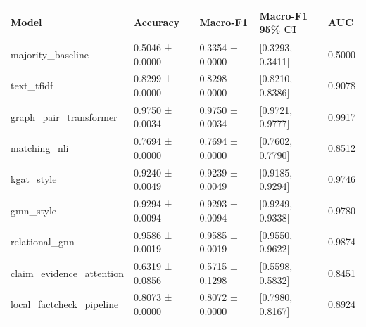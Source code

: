 \begin{tabular}{lllll}
\toprule
Model & Accuracy & Macro-F1 & Macro-F1 95\% CI & AUC \\
\midrule
majority\_baseline & 0.5046 ± 0.0000 & 0.3354 ± 0.0000 & [0.3293, 0.3411] & 0.5000 \\
text\_tfidf & 0.8299 ± 0.0000 & 0.8298 ± 0.0000 & [0.8210, 0.8386] & 0.9078 \\
graph\_pair\_transformer & 0.9750 ± 0.0034 & 0.9750 ± 0.0034 & [0.9721, 0.9777] & 0.9917 \\
matching\_nli & 0.7694 ± 0.0000 & 0.7694 ± 0.0000 & [0.7602, 0.7790] & 0.8512 \\
kgat\_style & 0.9240 ± 0.0049 & 0.9239 ± 0.0049 & [0.9185, 0.9294] & 0.9746 \\
gmn\_style & 0.9294 ± 0.0094 & 0.9293 ± 0.0094 & [0.9249, 0.9338] & 0.9780 \\
relational\_gnn & 0.9586 ± 0.0019 & 0.9585 ± 0.0019 & [0.9550, 0.9622] & 0.9874 \\
claim\_evidence\_attention & 0.6319 ± 0.0856 & 0.5715 ± 0.1298 & [0.5598, 0.5832] & 0.8451 \\
local\_factcheck\_pipeline & 0.8073 ± 0.0000 & 0.8072 ± 0.0000 & [0.7980, 0.8167] & 0.8924 \\
\bottomrule
\end{tabular}
